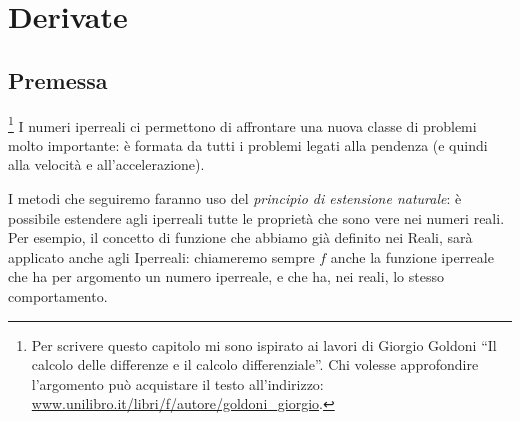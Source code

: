 



\chapter{Derivate}

% 

\section{Premessa}
\footnote{Per scrivere questo capitolo mi sono ispirato 
ai lavori di Giorgio Goldoni ``Il calcolo delle differenze e il calcolo 
differenziale''. 
Chi volesse approfondire l'argomento può acquistare il testo 
all'indirizzo: 
\href{https://www.unilibro.it/libri/f/autore/goldoni\_giorgio}
     {www.unilibro.it/libri/f/autore/goldoni\_giorgio}.}
I numeri iperreali ci permettono di affrontare una nuova classe di problemi 
molto importante: è formata da tutti i problemi legati alla pendenza (e 
quindi alla velocità e all'accelerazione).

I metodi che seguiremo faranno uso del \emph{principio di estensione 
naturale}: è possibile estendere agli iperreali tutte le proprietà che 
sono vere nei numeri reali.
Per esempio, il concetto di funzione che abbiamo già definito nei Reali, 
sarà applicato anche agli Iperreali: chiameremo sempre \(f\) anche
la funzione iperreale che ha per argomento un numero iperreale, 
e che ha, nei reali, lo stesso comportamento.

